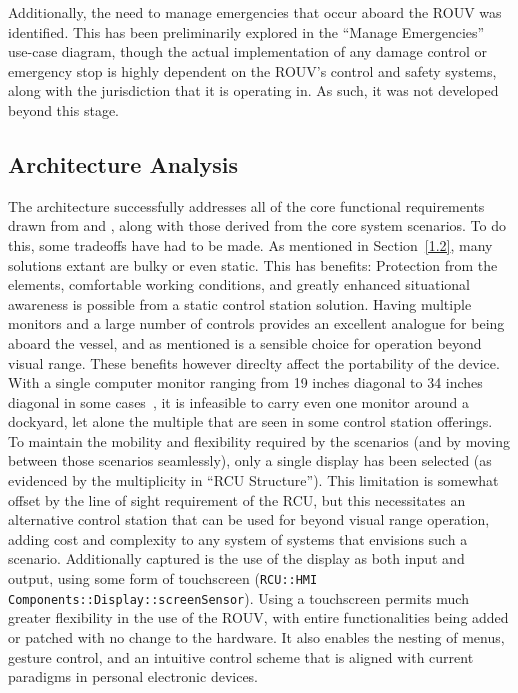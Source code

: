 \documentclass[../main.tex]{subfiles}
\begin{document}
Additionally, the need to manage emergencies that occur aboard the ROUV was identified.
This has been preliminarily explored in the ``Manage Emergencies'' use-case diagram, though the actual implementation of any damage control or emergency stop is highly dependent on the ROUV's control and safety systems, along with the jurisdiction that it is operating in.
As such, it was not developed beyond this stage.

\subsection{Architecture Analysis}

The architecture successfully addresses all of the core functional requirements drawn from \cite{WBC3} and \cite{COLREGS1972}, along with those derived from the core system scenarios.
To do this, some tradeoffs have had to be made.
As mentioned in Section~\ref{1.2}, many solutions extant are bulky or even static.
This has benefits: Protection from the elements, comfortable working conditions, and greatly enhanced situational awareness is possible from a static control station solution.
Having multiple monitors and a large number of controls provides an excellent analogue for being aboard the vessel, and as mentioned is a sensible choice for operation beyond visual range.
These benefits however direclty affect the portability of the device.
With a single computer monitor ranging from 19 inches diagonal to 34 inches diagonal in some cases~\cite{Knerl2024}, it is infeasible to carry even one monitor around a dockyard, let alone the multiple that are seen in some control station offerings.
To maintain the mobility and flexibility required by the scenarios (and by moving between those scenarios seamlessly), only a single display has been selected (as evidenced by the multiplicity in ``RCU Structure'').
This limitation is somewhat offset by the line of sight requirement of the RCU, but this necessitates an alternative control station that can be used for beyond visual range operation, adding cost and complexity to any system of systems that envisions such a scenario.
Additionally captured is the use of the display as both input and output, using some form of touchscreen (\texttt{RCU::HMI Components::Display::screenSensor}).
Using a touchscreen permits much greater flexibility in the use of the ROUV, with entire functionalities being added or patched with no change to the hardware.
It also enables the nesting of menus, gesture control, and an intuitive control scheme that is aligned with current paradigms in personal electronic devices.
\end{document}

